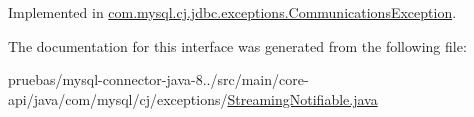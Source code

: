 Implemented in \mbox{\hyperlink{classcom_1_1mysql_1_1cj_1_1jdbc_1_1exceptions_1_1_communications_exception_a29388ae45258ad923ba62072c51507ae}{com.\+mysql.\+cj.\+jdbc.\+exceptions.\+Communications\+Exception}}.



The documentation for this interface was generated from the following file\+:\begin{DoxyCompactItemize}
\item 
pruebas/mysql-\/connector-\/java-\/8../src/main/core-\/api/java/com/mysql/cj/exceptions/\mbox{\hyperlink{_streaming_notifiable_8java}{Streaming\+Notifiable.\+java}}\end{DoxyCompactItemize}
